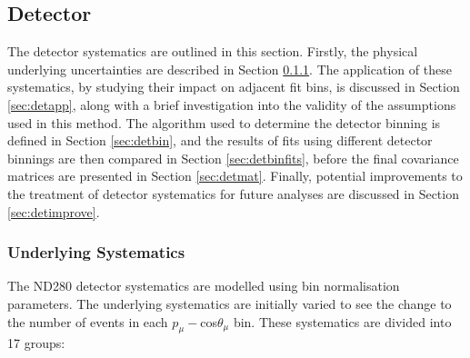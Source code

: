 \subsection{Detector}\label{sec:det}

The detector systematics are outlined in this section. Firstly, the physical underlying uncertainties are described in Section \ref{sec:detsyst}. The application of these systematics, by studying their impact on adjacent fit bins, is discussed in Section \ref{sec:detapp}, along with a brief investigation into the validity of the assumptions used in this method. The algorithm used to determine the detector binning is defined in Section \ref{sec:detbin}, and the results of fits using different detector binnings are then compared in Section \ref{sec:detbinfits}, before the final covariance matrices are presented in Section \ref{sec:detmat}. Finally, potential improvements to the treatment of detector systematics for future analyses are discussed in Section \ref{sec:detimprove}.

\subsubsection{Underlying Systematics}\label{sec:detsyst}

The ND280 detector systematics are modelled using bin normalisation parameters. The underlying systematics are initially varied to see the change to the number of events in each $p_{\mu} - $cos$ \theta_{\mu}$ bin. These systematics are divided into 17 groups:

